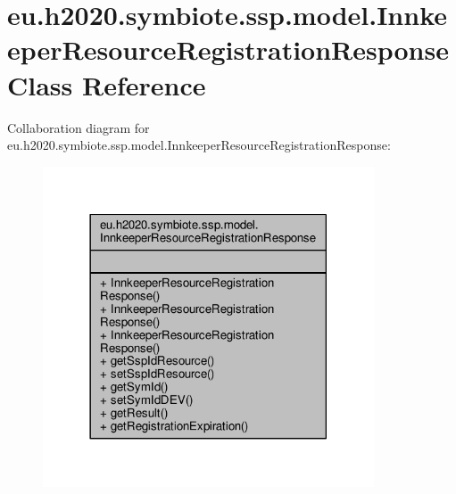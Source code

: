 \hypertarget{classeu_1_1h2020_1_1symbiote_1_1ssp_1_1model_1_1InnkeeperResourceRegistrationResponse}{}\section{eu.\+h2020.\+symbiote.\+ssp.\+model.\+Innkeeper\+Resource\+Registration\+Response Class Reference}
\label{classeu_1_1h2020_1_1symbiote_1_1ssp_1_1model_1_1InnkeeperResourceRegistrationResponse}


Collaboration diagram for eu.\+h2020.\+symbiote.\+ssp.\+model.\+Innkeeper\+Resource\+Registration\+Response\+:
\nopagebreak
\begin{figure}[H]
\begin{center}
\leavevmode
\includegraphics[width=278pt]{classeu_1_1h2020_1_1symbiote_1_1ssp_1_1model_1_1InnkeeperResourceRegistrationResponse__coll__graph}
\end{center}
\end{figure}

